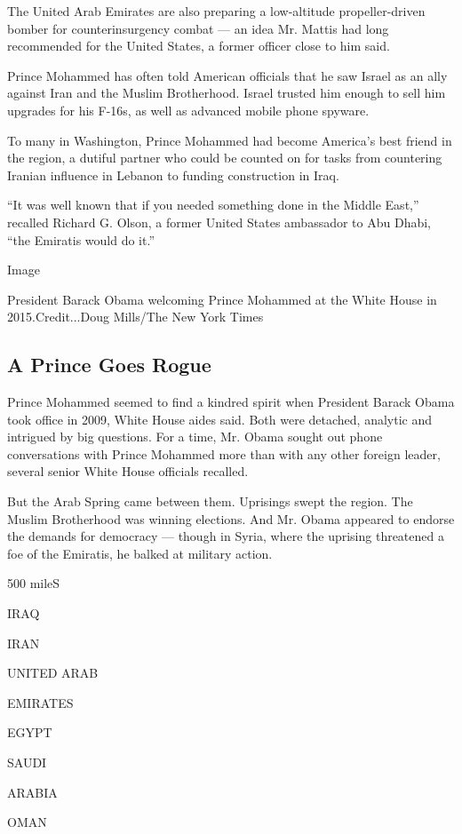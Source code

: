 The United Arab Emirates are also preparing a low-altitude
propeller-driven bomber for counterinsurgency combat --- an idea Mr.
Mattis had long recommended for the United States, a former officer
close to him said.

Prince Mohammed has often told American officials that he saw Israel as
an ally against Iran and the Muslim Brotherhood. Israel trusted him
enough to sell him upgrades for his F-16s, as well as advanced mobile
phone spyware.

To many in Washington, Prince Mohammed had become America's best friend
in the region, a dutiful partner who could be counted on for tasks from
countering Iranian influence in Lebanon to funding construction in Iraq.

``It was well known that if you needed something done in the Middle
East,'' recalled Richard G. Olson, a former United States ambassador to
Abu Dhabi, ``the Emiratis would do it.''

Image

President Barack Obama welcoming Prince Mohammed at the White House in
2015.Credit...Doug Mills/The New York Times

\hypertarget{a-prince-goes-rogue}{%
\subsection{A Prince Goes Rogue}\label{a-prince-goes-rogue}}

Prince Mohammed seemed to find a kindred spirit when President Barack
Obama took office in 2009, White House aides said. Both were detached,
analytic and intrigued by big questions. For a time, Mr. Obama sought
out phone conversations with Prince Mohammed more than with any other
foreign leader, several senior White House officials recalled.

But the Arab Spring came between them. Uprisings swept the region. The
Muslim Brotherhood was winning elections. And Mr. Obama appeared to
endorse the demands for democracy --- though in Syria, where the
uprising threatened a foe of the Emiratis, he balked at military action.

500 mileS

IRAQ

IRAN

UNITED ARAB

EMIRATES

EGYPT

SAUDI

ARABIA

OMAN

